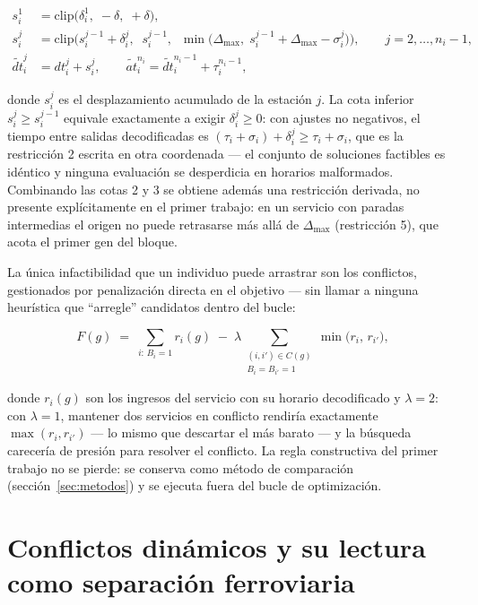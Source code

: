 \documentclass[11pt,a4paper]{article}
\begin{document}
\begin{align}
s_i^1 &= \mathrm{clip}\big(\delta_i^1,\; -\delta,\; +\delta\big), \\
s_i^j &= \mathrm{clip}\Big(s_i^{j-1} + \delta_i^j,\;\; s_i^{j-1},\;\;
\min\big(\Delta_{\max},\; s_i^{j-1} + \Delta_{\max} - \sigma_i^j\big)\Big),
\qquad j = 2,\dots,n_i-1, \\
\tilde{dt}_i^j &= dt_i^j + s_i^j, \qquad
\tilde{at}_i^{n_i} = \tilde{dt}_i^{n_i-1} + \tau_i^{n_i-1},
\end{align}

donde $s_i^j$ es el desplazamiento acumulado de la estación $j$. La cota
inferior $s_i^j \ge s_i^{j-1}$ equivale exactamente a exigir
$\delta_i^j \ge 0$: con ajustes no negativos, el tiempo entre salidas
decodificadas es $(\tau_i + \sigma_i) + \delta_i^j \ge \tau_i + \sigma_i$,
que es la restricción 2 escrita en otra coordenada --- el conjunto de
soluciones factibles es idéntico y ninguna evaluación se desperdicia en
horarios malformados. Combinando las cotas 2 y 3 se obtiene además una
restricción derivada, no presente explícitamente en el primer trabajo: en
un servicio con paradas intermedias el origen no puede retrasarse más allá
de $\Delta_{\max}$ (restricción 5), que acota el primer gen del bloque.

La única infactibilidad que un individuo puede arrastrar son los
conflictos, gestionados por penalización directa en el objetivo --- sin
llamar a ninguna heurística que ``arregle'' candidatos dentro del bucle:

\begin{equation}
F(g) \;=\; \sum_{i:\,B_i=1} r_i(g) \;-\;
\lambda \sum_{\substack{(i,i') \in C(g)\\ B_i = B_{i'} = 1}}
\min\big(r_i,\, r_{i'}\big),
\label{ec:fitness}
\end{equation}

donde $r_i(g)$ son los ingresos del servicio con su horario decodificado y
$\lambda = 2$: con $\lambda = 1$, mantener dos servicios en conflicto
rendiría exactamente $\max(r_i, r_{i'})$ --- lo mismo que descartar el más
barato --- y la búsqueda carecería de presión para resolver el conflicto.
La regla constructiva del primer trabajo no se pierde: se conserva como
método de comparación (sección~\ref{sec:metodos}) y se ejecuta fuera del
bucle de optimización.

\section{Conflictos dinámicos y su lectura como separación ferroviaria}
\label{sec:conflictos}
\end{document}
